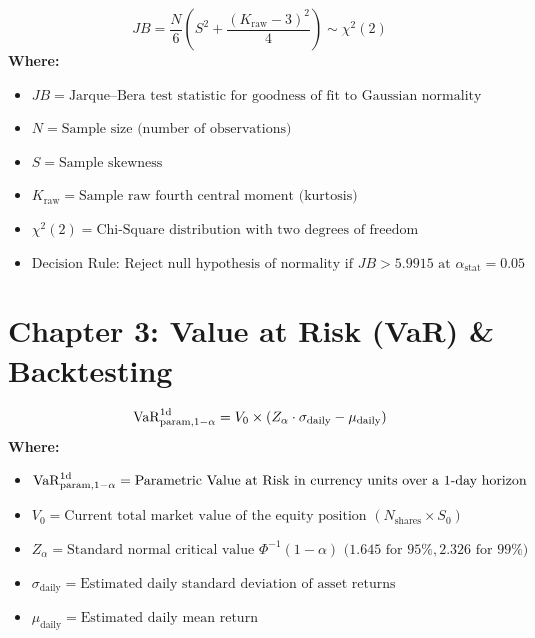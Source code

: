 \begin{formulabox}
\begin{equation*}
JB = \frac{N}{6}\left(S^2 + \frac{(K_{\text{raw}} - 3)^2}{4}\right) \sim \chi^2(2)
\end{equation*}
\textbf{Where:}
\begin{itemize}[leftmargin=1.8em, noitemsep]
    \item $JB = \text{Jarque--Bera test statistic for goodness of fit to Gaussian normality}$
    \item $N = \text{Sample size (number of observations)}$
    \item $S = \text{Sample skewness}$
    \item $K_{\text{raw}} = \text{Sample raw fourth central moment (kurtosis)}$
    \item $\chi^2(2) = \text{Chi-Square distribution with two degrees of freedom}$
    \item $\text{Decision Rule: Reject null hypothesis of normality if } JB > 5.9915 \text{ at } \alpha_{\text{stat}} = 0.05$
\end{itemize}
\end{formulabox}

\newpage
\section*{Chapter 3: Value at Risk (VaR) \& Backtesting}

\begin{formulabox}
\begin{equation*}
\operatorname{VaR}_{\text{param}, 1-\alpha}^{1\text{d}} = V_0 \times \left(Z_{\alpha} \cdot \sigma_{\text{daily}} - \mu_{\text{daily}}\right)
\end{equation*}
\textbf{Where:}
\begin{itemize}[leftmargin=1.8em, noitemsep]
    \item $\operatorname{VaR}_{\text{param}, 1-\alpha}^{1\text{d}} = \text{Parametric Value at Risk in currency units over a 1-day horizon}$
    \item $V_0 = \text{Current total market value of the equity position } (N_{\text{shares}} \times S_0)$
    \item $Z_{\alpha} = \text{Standard normal critical value } \Phi^{-1}(1 - \alpha) \text{ ($1.645$ for } 95\%, 2.326 \text{ for } 99\%)$
    \item $\sigma_{\text{daily}} = \text{Estimated daily standard deviation of asset returns}$
    \item $\mu_{\text{daily}} = \text{Estimated daily mean return}$
\end{itemize}
\end{formulabox}

